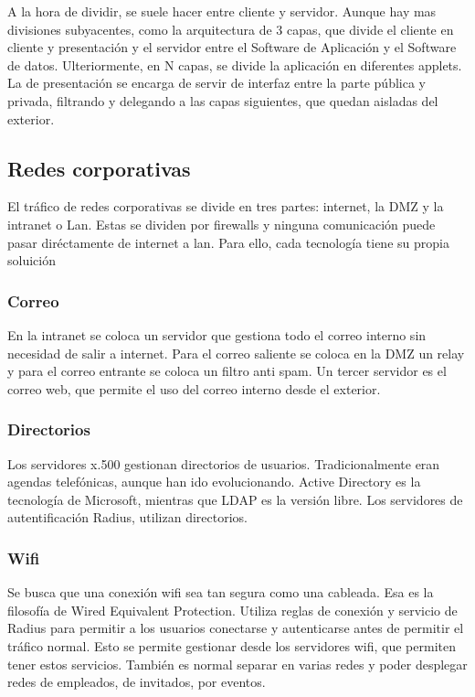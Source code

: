     A la hora de dividir, se suele hacer entre cliente y servidor. Aunque hay mas divisiones subyacentes, como la arquitectura de 3 capas, que divide el cliente en cliente y presentación y el servidor entre el Software de Aplicación y el Software de datos. Ulteriormente, en N capas, se divide la aplicación en diferentes applets. La de presentación se encarga de servir de interfaz entre la parte pública y privada, filtrando y delegando a las capas siguientes, que quedan aisladas del exterior.

\subsection{Redes corporativas}
    El tráfico de redes corporativas se divide en tres partes: internet, la DMZ y la intranet o Lan. Estas se dividen por firewalls y ninguna comunicación puede pasar diréctamente de internet a lan. Para ello, cada tecnología tiene su propia soluición

    \subsubsection{Correo}
        En la intranet se coloca un servidor que gestiona todo el correo interno sin necesidad de salir a internet. Para el correo saliente se coloca en la DMZ un relay y para el correo entrante se coloca un filtro anti spam. Un tercer servidor es el correo web, que permite el uso del correo interno desde el exterior.
    \subsubsection{Directorios}
        Los servidores x.500 gestionan directorios de usuarios. Tradicionalmente eran agendas telefónicas, aunque han ido evolucionando. Active Directory es la tecnología de Microsoft, mientras que LDAP es la versión libre. Los servidores de autentificación Radius, utilizan directorios.

    \subsubsection{Wifi}
        Se busca que una conexión wifi sea tan segura como una cableada. Esa es la filosofía de Wired Equivalent Protection. Utiliza reglas de conexión y servicio de Radius para permitir a los usuarios conectarse y autenticarse antes de permitir el tráfico normal. Esto se permite gestionar desde los servidores wifi, que permiten tener estos servicios. También es normal separar en varias redes y poder desplegar redes de empleados, de invitados, por eventos.
    
